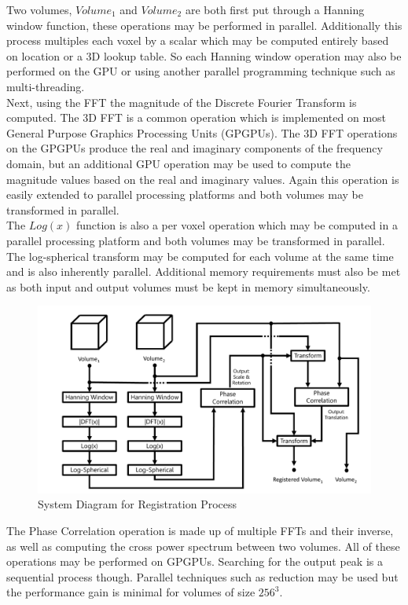 Two volumes, $Volume_1$ and $Volume_2$ are both first put through a Hanning window function, these operations may be performed in parallel. Additionally this process multiples each voxel by a scalar which may be computed entirely based on location or a 3D lookup table. So each Hanning window operation may also be performed on the GPU or using another parallel programming technique such as multi-threading. \\

Next, using the FFT the magnitude of the Discrete Fourier Transform is computed. The 3D FFT is a common operation which is implemented on most General Purpose Graphics Processing Units (GPGPUs). The 3D FFT operations on the GPGPUs produce the real and imaginary components of the frequency domain, but an additional GPU operation may be used to compute the magnitude values based on the real and imaginary values. Again this operation is easily extended to parallel processing platforms and both volumes may be transformed in parallel. \\

The $Log(x)$ function is also a per voxel operation which may be computed in a parallel processing platform and both volumes may be transformed in parallel. The log-spherical transform may be computed for each volume at the same time and is also inherently parallel. Additional memory requirements must also be met as both input and output volumes must be kept in memory simultaneously. \\

\begin{figure}[!htb]
\centering
\includegraphics[width=6.0in]{images/ch2/pipeline2}
\caption{System Diagram for Registration Process}
\label{fig:PIPELINENo1}
\end{figure}


The Phase Correlation operation is made up of multiple FFTs and their inverse, as well as computing the cross power spectrum between two volumes. All of these operations may be performed on GPGPUs. Searching for the output peak is a sequential process though. Parallel techniques such as reduction may be used but the performance gain is minimal for volumes of size $256^3$. \\

